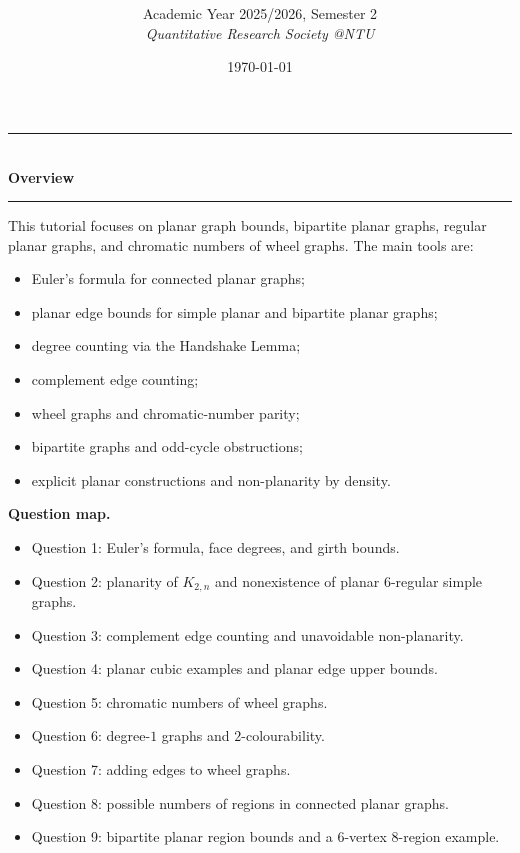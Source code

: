 \documentclass[12pt]{article}
\title{
\CourseCode\ \CourseName \\[0.3em]
\large \DocType
}
\author{
  Academic Year 2025/2026, Semester 2 \\[0.25em]
  \textit{Quantitative Research Society @NTU}
}
\date{\today}
\begin{document}
\maketitle
\thispagestyle{plainfirst}
\pagestyle{main}

\begin{center}
  \rule{0.82\textwidth}{0.4pt}\\[4pt]
  \textbf{Overview}\\[2pt]
  \rule{0.82\textwidth}{0.4pt}
\end{center}

\noindent
This tutorial focuses on planar graph bounds, bipartite planar graphs, regular planar graphs, and chromatic numbers of wheel graphs. The main tools are:
\begin{itemize}[leftmargin=*]
  \item Euler's formula for connected planar graphs;
  \item planar edge bounds for simple planar and bipartite planar graphs;
  \item degree counting via the Handshake Lemma;
  \item complement edge counting;
  \item wheel graphs and chromatic-number parity;
  \item bipartite graphs and odd-cycle obstructions;
  \item explicit planar constructions and non-planarity by density.
\end{itemize}

\noindent
\textbf{Question map.}
\begin{itemize}[leftmargin=*]
  \item Question 1: Euler's formula, face degrees, and girth bounds.
  \item Question 2: planarity of $K_{2,n}$ and nonexistence of planar $6$-regular simple graphs.
  \item Question 3: complement edge counting and unavoidable non-planarity.
  \item Question 4: planar cubic examples and planar edge upper bounds.
  \item Question 5: chromatic numbers of wheel graphs.
  \item Question 6: degree-$1$ graphs and $2$-colourability.
  \item Question 7: adding edges to wheel graphs.
  \item Question 8: possible numbers of regions in connected planar graphs.
  \item Question 9: bipartite planar region bounds and a $6$-vertex $8$-region example.
\end{itemize}
\end{document}
